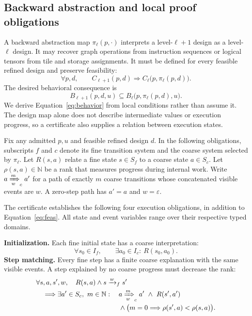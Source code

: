 \documentclass[11pt]{article}
\begin{document}
\subsection{Backward abstraction and local proof obligations}
A backward abstraction map $\pi_\ell(p,\cdot)$ interprets a level-$\ell+1$ design as a level-$\ell$ design. It may recover graph operations from instruction sequences or logical tensors from tile and storage assignments. It must be defined for every feasible refined design and preserve feasibility:
\begin{equation}
 \forall p,d,\qquad C_{\ell+1}(p,d)
 \Longrightarrow C_\ell\bigl(p,\pi_\ell(p,d)\bigr).
 \label{eq:feas}
\end{equation}
The desired behavioral consequence is
\begin{equation}
 B_{\ell+1}(p,d,u)
 \subseteq B_\ell\bigl(p,\pi_\ell(p,d),u\bigr).
 \label{eq:behavior}
\end{equation}
We derive Equation~\ref{eq:behavior} from local conditions rather than assume it. The design map alone does not describe intermediate values or execution progress, so a certificate also supplies a relation between execution states.

Fix any admitted $p,u$ and feasible refined design $d$. In the following obligations, subscripts $f$ and $c$ denote its fine transition system and the coarse system selected by $\pi_\ell$. Let $R(s,a)$ relate a fine state $s\in S_f$ to a coarse state $a\in S_c$. Let $\rho(s,a)\in\mathbb N$ be a rank that measures progress during internal work. Write $a\xRightarrow[w]{m}_c a'$ for a path of exactly $m$ coarse transitions whose concatenated visible events are $w$. A zero-step path has $a'=a$ and $w=\varepsilon$.

The certificate establishes the following four execution obligations, in addition to Equation~\ref{eq:feas}. All state and event variables range over their respective typed domains.

\textbf{Initialization.} Each fine initial state has a coarse interpretation:
\begin{equation}
 \forall s_0\in I_f,\qquad \exists a_0\in I_c:\ R(s_0,a_0).
 \label{eq:init}
\end{equation}
\textbf{Step matching.} Every fine step has a finite coarse explanation with the same visible events. A step explained by no coarse progress must decrease the rank:
\begin{equation}
\begin{aligned}
 &\forall s,a,s',w,\quad R(s,a)\land s\xrightarrow{w}_f s'\\
 &\quad\Longrightarrow\exists a'\in S_c,\ m\in\mathbb N:\quad
 a\xRightarrow[w]{m}_c a'\ \land\ R(s',a')\\
 &\hspace{43mm}\land\bigl(m=0\Longrightarrow\rho(s',a)<\rho(s,a)\bigr).
\end{aligned}
 \label{eq:step}
\end{equation}
\end{document}
